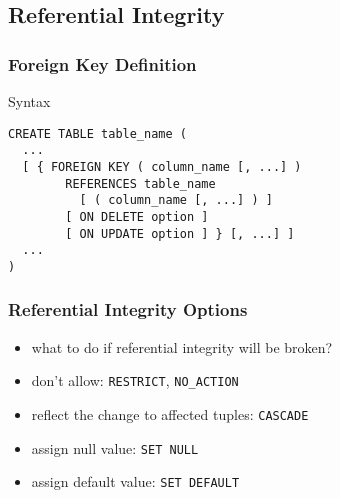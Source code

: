 \documentclass[dvipsnames]{beamer}
\theoremstyle{plain}
\begin{document}
\subsection{Referential Integrity}

\begin{frame}[fragile]
  \frametitle{Foreign Key Definition}

  \begin{block}{Syntax}
    \begin{lstlisting}
CREATE TABLE table_name (
  ...
  [ { FOREIGN KEY ( column_name [, ...] )
        REFERENCES table_name
          [ ( column_name [, ...] ) ]
        [ ON DELETE option ]
        [ ON UPDATE option ] } [, ...] ]
  ...
)
    \end{lstlisting}
  \end{block}
\end{frame}

\begin{frame}
  \frametitle{Referential Integrity Options}

  \begin{itemize}
    \item what to do if referential integrity will be broken?

    \medskip
    \item don't allow: \texttt{RESTRICT}, \texttt{NO\_ACTION}
    \item reflect the change to affected tuples: \texttt{CASCADE}
    \item assign null value: \texttt{SET NULL}
    \item assign default value: \texttt{SET DEFAULT}
  \end{itemize}
\end{frame}
\end{document}
